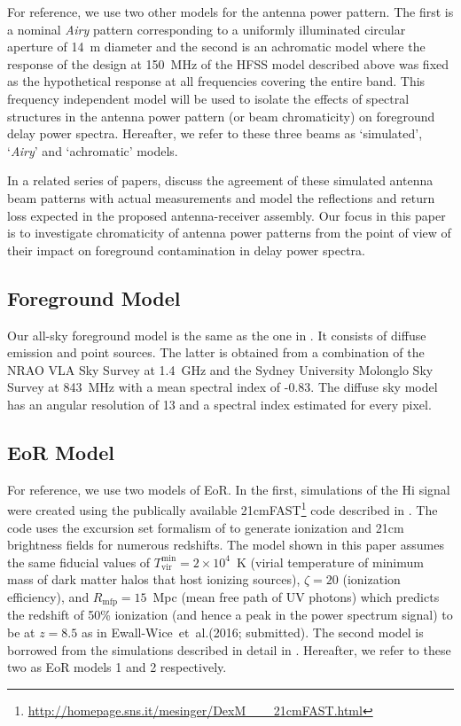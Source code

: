\documentclass[preprint2,iop,numberedappendix,twocolappendix,appendixfloats]{emulateapj}
\begin{document}
For reference, we use two other models for the antenna power pattern. The first is a nominal {\it Airy} pattern corresponding to a uniformly illuminated circular aperture of 14~m diameter and the second is an achromatic model where the response of the design at 150~MHz of the HFSS model described above was fixed as the hypothetical response at all frequencies covering the entire band. This frequency independent model will be used to isolate the effects of spectral structures in the antenna power pattern (or beam chromaticity) on foreground delay power spectra. Hereafter, we refer to these three beams as `simulated', `{\it Airy}' and `achromatic' models.

In a related series of papers, \citet{neb16} discuss the agreement of these simulated antenna beam patterns with actual measurements and \citet{ewa16} model the reflections and return loss expected in the proposed antenna-receiver assembly. Our focus in this paper is to investigate chromaticity of antenna power patterns from the point of view of their impact on foreground contamination in delay power spectra.

\subsection{Foreground Model}\label{sec:foreground}

Our all-sky foreground model is the same as the one in \citet{thy15a}. It consists of diffuse emission \citep{deo08} and point sources. The latter is obtained from a combination of the NRAO VLA Sky Survey \citep[NVSS;][]{con98} at 1.4~GHz and the Sydney University Molonglo Sky Survey \citep[SUMSS;][]{boc99,mau03} at 843~MHz with a mean spectral index of -0.83. The diffuse sky model has an angular resolution of 13 and a spectral index estimated for every pixel.

\subsection{EoR Model}\label{sec:EoR-model}

For reference, we use two models of EoR. In the first, simulations of the H{\sc i} signal were created using the publically available 21cmFAST\footnote{\url{http://homepage.sns.it/mesinger/DexM\_\_\_21cmFAST.html}} code described in \citet{mes11}. The code uses the excursion set formalism of \citet{fur04a} to generate ionization and 21cm brightness fields for numerous redshifts. The model shown in this paper assumes the same fiducial values of $T_\text{vir}^\text{min} = 2 \times 10^4$~K (virial temperature of minimum mass of dark matter halos that host ionizing sources), $\zeta = 20$ (ionization efficiency), and $R_\text{mfp}=15$~Mpc (mean free path of UV photons) which predicts the redshift of 50\% ionization (and hence a peak in the power spectrum signal) to be at $z=8.5$ as in Ewall-Wice~et~al.(2016; submitted). The second model is borrowed from the simulations described in detail in \citet{lid08}. Hereafter, we refer to these two as EoR models 1 and 2 respectively. 
\end{document}
